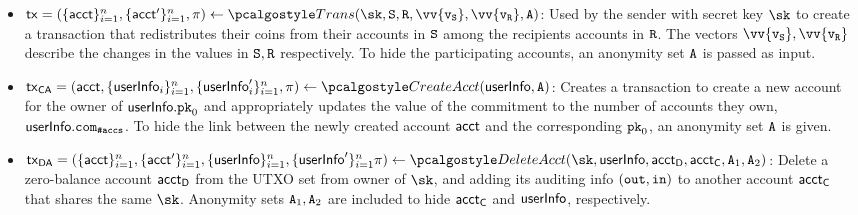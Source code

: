 \begin{itemize}
    \item $\txn = (\{\acct\}_{i=1}^n, \{{\acct}'\}_{i=1}^n, \pi) \gets \trans(\sk,\sset, \rset, \vv{\v_\sset}, \vv{\v_\rset}, \anset)$:
    Used by the sender with secret key $\sk$ to create a transaction that redistributes their coins from their accounts in $\mathtt{S}$ among the recipients accounts in $\mathtt{R}$. The vectors $\vv{\v_\sset},\vv{\v_\rset}$ describe the changes in the values in $\mathtt{S}, \mathtt{R}$ respectively. To hide the participating accounts, an anonymity set ${\mathtt{A}}$ is passed as input.



    \item $\txnca = (\acct, \{\userinfo_i\}_{i=1}^n, \{\userinfo_i^\prime\}_{i=1}^n, \pi)\gets \createAcct(\userinfo, \anset)$: 
        Creates a transaction to create a new account for the owner of $\textup{\textsf{userInfo}}.\textup{\texttt{pk}}_{0}$ and appropriately updates the value of the commitment to the number of accounts they own, $\textup{\textsf{userInfo}}.\texttt{com}_{\textup{\texttt{\#accs}}}$.
        To hide the link between the newly created account $\textup{\textsf{acct}}$ and the corresponding $\textup{\texttt{pk}}_{0}$, an anonymity set ${\mathtt{A}}$ is given.
    

    \item $\txnda = (\{\acct\}_{i=1}^n, \{{\acct}'\}_{i=1}^n, \{\userinfo\}_{i=1}^n, \{{\userinfo}'\}_{i=1}^n  \pi) \gets \deleteAcct(\sk, \userinfo, \accttodelete, \accttotransfer, \anset_1, \anset_2)$: 
        Delete a zero-balance account $\textup{\textsf{acct}}_\textsf{D}$ from the UTXO set from owner of $\sk$, and adding its auditing info $(\textup{\texttt{{out}}}, \textup{\texttt{{in}}})$ to another account $\textup{\textsf{acct}}_\textsf{C}$ that shares the same $\sk$. Anonymity sets ${\mathtt{A}}_1, {\mathtt{A}}_2$ are included to hide $\textup{\textsf{acct}}_\textsf{C}$ and $\textup{\textsf{userInfo}}$, respectively.


\end{itemize}
